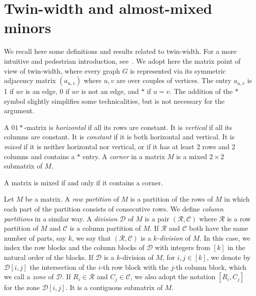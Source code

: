 \section{Twin-width and almost-mixed minors}
  
  We recall here some definitions and results related to twin-width. For a more intuitive and pedestrian introduction, see~\cite{BKTW21}. We adopt here the matrix point of view of twin-width, where every graph $G$ is represented via its symmetric adjacency matrix $(a_{u,v})$ where $u,v$ are over couples of vertices. The entry $a_{u,v}$ is 1 if $uv$ is an edge, 0 if $uv$ is not an edge, and $*$ if $u=v$. The addition of the $*$ symbol slightly simplifies some technicalities, but is not necessary for the argument.
  
    A $01*$-matrix is \emph{horizontal} if all its rows are constant. It is \emph{vertical} if all its columns are constant. It is \emph{constant} if it is both horizontal and vertical. It is \emph{mixed} if it is neither horizontal nor vertical, or if it has at least 2 rows and 2 columns and contains a $*$ entry.
A \emph{corner} in a matrix $M$ is a mixed $2 \times 2$ submatrix of $M$.


\begin{lemma}\label{lem:corner}
 A matrix is mixed if and only if it contains a corner.
\end{lemma}

   Let $M$ be a matrix. 
    A \emph{row partition} of $M$ is a partition of the rows of $M$ in which each part of the partition consists of consecutive rows. We define \emph{column partitions} in a similar way. 
    A \emph{division} $\mathcal{D}$ of $M$ is a pair $(\mathcal{R}, \mathcal{C})$ where $\mathcal{R}$ is a row partition of $M$ and $\mathcal{C}$ is a column partition of $M$. If $\mathcal{R}$ and $\mathcal{C}$ both have the same number of parts, say $k$, we say that $(\mathcal{R}, \mathcal{C})$ is a \emph{$k$-division} of $M$. In this case, we index the row blocks and the column blocks of $\mathcal{D}$ with integers from $[k]$ in the natural order of the blocks. 
    If $\mathcal{D}$ is a $k$-division of $M$, for $i, j \in [k]$, we denote by $\mathcal{D}[i, j]$ the intersection of the $i$-th row block with the $j$-th column block, which we call a \emph{zone} of $\mathcal{D}$.  If $R_i\in \mathcal{R}$ and $C_j\in\mathcal{C}$, we also adopt the notation $[R_i,C_j]$ for the zone $\mathcal{D}[i, j]$. It is a contiguous submatrix of $M$. %
    
